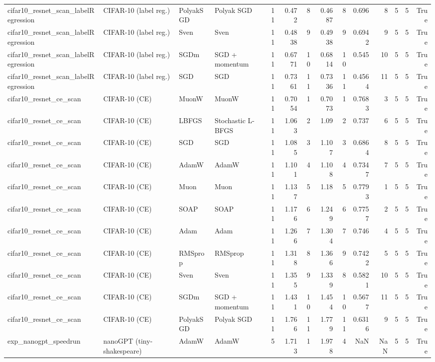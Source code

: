 \begin{tabular}{llllrrrrrrrrrr}
cifar10\_resnet\_scan\_labelRegression & CIFAR-10 (label reg.) & PolyakSGD & Polyak SGD & 11 & 0.472 & 8 & 0.4687 & 8 & 0.696 & 8 & 5 & 5 & True \\
cifar10\_resnet\_scan\_labelRegression & CIFAR-10 (label reg.) & Sven & Sven & 11 & 0.4838 & 9 & 0.4938 & 9 & 0.6942 & 9 & 5 & 5 & True \\
cifar10\_resnet\_scan\_labelRegression & CIFAR-10 (label reg.) & SGDm & SGD + momentum & 11 & 0.6771 & 10 & 0.6814 & 10 & 0.545 & 10 & 5 & 5 & True \\
cifar10\_resnet\_scan\_labelRegression & CIFAR-10 (label reg.) & SGD & SGD & 11 & 0.7361 & 11 & 0.7336 & 11 & 0.4564 & 11 & 5 & 5 & True \\
cifar10\_resnet\_ce\_scan & CIFAR-10 (CE) & MuonW & MuonW & 11 & 0.7054 & 1 & 0.7073 & 1 & 0.7683 & 3 & 5 & 5 & True \\
cifar10\_resnet\_ce\_scan & CIFAR-10 (CE) & LBFGS & Stochastic L-BFGS & 11 & 1.063 & 2 & 1.09 & 2 & 0.737 & 6 & 5 & 5 & True \\
cifar10\_resnet\_ce\_scan & CIFAR-10 (CE) & SGD & SGD & 11 & 1.085 & 3 & 1.107 & 3 & 0.6864 & 8 & 5 & 5 & True \\
cifar10\_resnet\_ce\_scan & CIFAR-10 (CE) & AdamW & AdamW & 11 & 1.101 & 4 & 1.108 & 4 & 0.7347 & 7 & 5 & 5 & True \\
cifar10\_resnet\_ce\_scan & CIFAR-10 (CE) & Muon & Muon & 11 & 1.137 & 5 & 1.18 & 5 & 0.7793 & 1 & 5 & 5 & True \\
cifar10\_resnet\_ce\_scan & CIFAR-10 (CE) & SOAP & SOAP & 11 & 1.176 & 6 & 1.249 & 6 & 0.7757 & 2 & 5 & 5 & True \\
cifar10\_resnet\_ce\_scan & CIFAR-10 (CE) & Adam & Adam & 11 & 1.266 & 7 & 1.304 & 7 & 0.746 & 4 & 5 & 5 & True \\
cifar10\_resnet\_ce\_scan & CIFAR-10 (CE) & RMSprop & RMSprop & 11 & 1.318 & 8 & 1.366 & 9 & 0.7422 & 5 & 5 & 5 & True \\
cifar10\_resnet\_ce\_scan & CIFAR-10 (CE) & Sven & Sven & 11 & 1.355 & 9 & 1.339 & 8 & 0.5821 & 10 & 5 & 5 & True \\
cifar10\_resnet\_ce\_scan & CIFAR-10 (CE) & SGDm & SGD + momentum & 11 & 1.431 & 10 & 1.454 & 10 & 0.5677 & 11 & 5 & 5 & True \\
cifar10\_resnet\_ce\_scan & CIFAR-10 (CE) & PolyakSGD & Polyak SGD & 11 & 1.766 & 11 & 1.779 & 11 & 0.6316 & 9 & 5 & 5 & True \\
exp\_nanogpt\_speedrun & nanoGPT (tiny-shakespeare) & AdamW & AdamW & 5 & 1.713 & 1 & 1.978 & 4 & NaN & NaN & 5 & 5 & True \\

\end{tabular}
